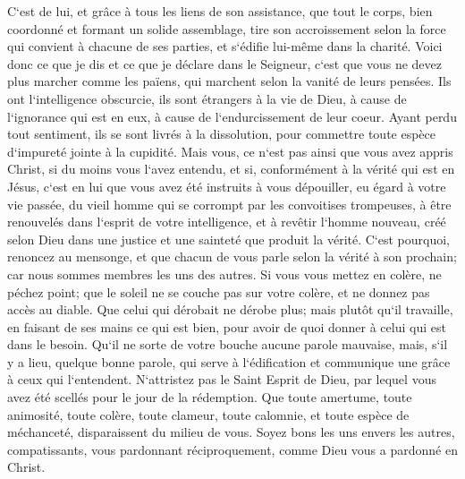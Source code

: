 \verse C`est de lui, et grâce à tous les liens de son assistance, que tout le corps, bien coordonné et formant un solide assemblage, tire son accroissement selon la force qui convient à chacune de ses parties, et s`édifie lui-même dans la charité. 
\verse Voici donc ce que je dis et ce que je déclare dans le Seigneur, c`est que vous ne devez plus marcher comme les païens, qui marchent selon la vanité de leurs pensées. 
\verse Ils ont l`intelligence obscurcie, ils sont étrangers à la vie de Dieu, à cause de l`ignorance qui est en eux, à cause de l`endurcissement de leur coeur. 
\verse Ayant perdu tout sentiment, ils se sont livrés à la dissolution, pour commettre toute espèce d`impureté jointe à la cupidité. 
\verse Mais vous, ce n`est pas ainsi que vous avez appris Christ, 
\verse si du moins vous l`avez entendu, et si, conformément à la vérité qui est en Jésus, c`est en lui que vous avez été instruits à vous dépouiller, 
\verse eu égard à votre vie passée, du vieil homme qui se corrompt par les convoitises trompeuses, 
\verse à être renouvelés dans l`esprit de votre intelligence, 
\verse et à revêtir l`homme nouveau, créé selon Dieu dans une justice et une sainteté que produit la vérité. 
\verse C`est pourquoi, renoncez au mensonge, et que chacun de vous parle selon la vérité à son prochain; car nous sommes membres les uns des autres. 
\verse Si vous vous mettez en colère, ne péchez point; que le soleil ne se couche pas sur votre colère, 
\verse et ne donnez pas accès au diable. 
\verse Que celui qui dérobait ne dérobe plus; mais plutôt qu`il travaille, en faisant de ses mains ce qui est bien, pour avoir de quoi donner à celui qui est dans le besoin. 
\verse Qu`il ne sorte de votre bouche aucune parole mauvaise, mais, s`il y a lieu, quelque bonne parole, qui serve à l`édification et communique une grâce à ceux qui l`entendent. 
\verse N`attristez pas le Saint Esprit de Dieu, par lequel vous avez été scellés pour le jour de la rédemption. 
\verse Que toute amertume, toute animosité, toute colère, toute clameur, toute calomnie, et toute espèce de méchanceté, disparaissent du milieu de vous. 
\verse Soyez bons les uns envers les autres, compatissants, vous pardonnant réciproquement, comme Dieu vous a pardonné en Christ. 


